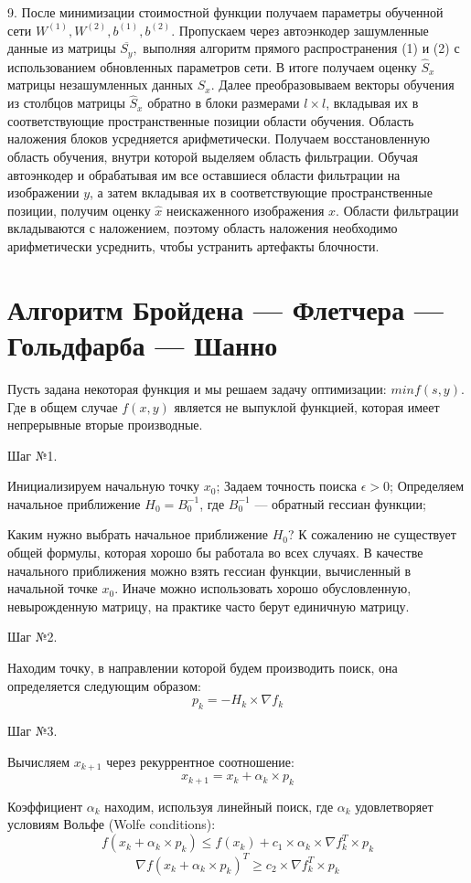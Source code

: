 \documentclass[a4paper,12pt]{article}
\begin{document}
9. После минимизации стоимостной функции получаем параметры обученной сети $W^{(1)}, W^{(2)}, b^{(1)}, b^{(2)}.$ Пропускаем через автоэнкодер зашумленные данные из матрицы $\overline{S_y},$ выполняя алгоритм прямого распространения (1) и (2) с использованием обновленных параметров сети. В итоге получаем оценку $\hat{S}_x$ матрицы незашумленных данных $S_x$. Далее преобразовываем векторы обучения из столбцов матрицы $\hat{S}_x$ обратно в блоки размерами $l\times l$, вкладывая их в соответствующие пространственные позиции области обучения. Область наложения блоков усредняется арифметически. Получаем восстановленную область обучения, внутри которой выделяем область фильтрации. Обучая автоэнкодер и обрабатывая им все оставшиеся области фильтрации на изображении $y$, а затем вкладывая их в соответствующие пространственные позиции, получим оценку $\hat{x}$ неискаженного изображения $x$. Области фильтрации вкладываются с наложением, поэтому область наложения необходимо арифметически усреднить, чтобы устранить артефакты блочности.
\newpage
\section{Алгоритм Бройдена — Флетчера — Гольдфарба — Шанно}

   Пусть задана некоторая функция  и мы решаем задачу оптимизации: $minf(s,y)$.
Где в общем случае $f(x,y)$ является не выпуклой функцией, которая имеет непрерывные вторые производные.

Шаг №1.

Инициализируем начальную точку $x_0$;
Задаем точность поиска  $\epsilon > 0$;
Определяем начальное приближение $H_0 = B_0^{-1}$, где $B_0^{-1}$ — обратный гессиан функции;

Каким нужно выбрать начальное приближение $H_0$?
К сожалению не существует общей формулы, которая хорошо бы работала во всех случаях. В качестве начального приближения можно взять гессиан функции, вычисленный в начальной точке $x_0$. Иначе можно использовать хорошо обусловленную, невырожденную матрицу, на практике часто берут единичную матрицу.

Шаг №2.

Находим точку, в направлении которой будем производить поиск, она определяется следующим образом:
$$p_k = -H_k \times \nabla f_k$$

Шаг №3.

Вычисляем $x_{k+1}$ через рекуррентное соотношение:
$$x_{k+1} = x_k+ \alpha_k \times p_k$$

Коэффициент $\alpha_k$ находим, используя линейный поиск, где $\alpha_k$ удовлетворяет условиям Вольфе (Wolfe conditions):
$$f(x_k+\alpha_k \times p_k) \leq f(x_k)+c_1 \times \alpha_k \times \nabla f_k^T \times p_k$$
$$\nabla f(x_k+\alpha_k \times p_k)^T \geq c_2 \times \nabla f_k^T \times p_k$$
\end{document}
